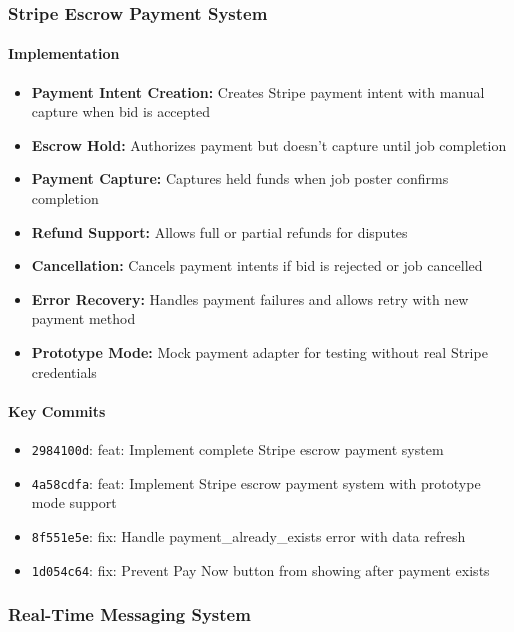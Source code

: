 \documentclass[11pt]{article}
\begin{document}
\subsubsection{Stripe Escrow Payment System}
\paragraph{Implementation}
\begin{itemize}[leftmargin=1.4em]
  \item \textbf{Payment Intent Creation:} Creates Stripe payment intent with manual capture when bid is accepted
  \item \textbf{Escrow Hold:} Authorizes payment but doesn't capture until job completion
  \item \textbf{Payment Capture:} Captures held funds when job poster confirms completion
  \item \textbf{Refund Support:} Allows full or partial refunds for disputes
  \item \textbf{Cancellation:} Cancels payment intents if bid is rejected or job cancelled
  \item \textbf{Error Recovery:} Handles payment failures and allows retry with new payment method
  \item \textbf{Prototype Mode:} Mock payment adapter for testing without real Stripe credentials
\end{itemize}

\paragraph{Key Commits}
\begin{itemize}[leftmargin=1.4em]
  \item \texttt{2984100d}: feat: Implement complete Stripe escrow payment system
  \item \texttt{4a58cdfa}: feat: Implement Stripe escrow payment system with prototype mode support
  \item \texttt{8f551e5e}: fix: Handle payment\_already\_exists error with data refresh
  \item \texttt{1d054c64}: fix: Prevent Pay Now button from showing after payment exists
\end{itemize}

\subsubsection{Real-Time Messaging System}
\end{document}
